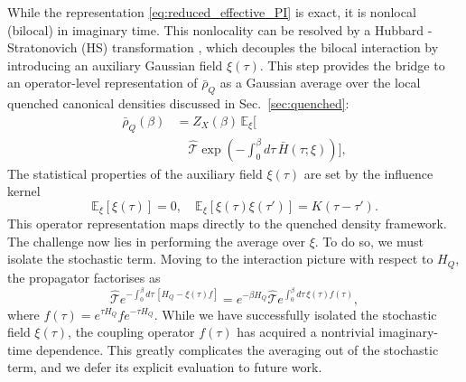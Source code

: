 While the representation \eqref{eq:reduced_effective_PI} is exact, it is nonlocal (bilocal) in imaginary time. This nonlocality can be resolved by a Hubbard - Stratonovich (HS) transformation \cite{hubbardCalculationPartitionFunctions1959a, stratonovich1957QDistro}, which decouples the bilocal interaction by introducing an auxiliary Gaussian field $\xi(\tau)$. This step provides the bridge to an operator-level representation of $\bar{\rho}_Q$ as a Gaussian average over the local quenched canonical densities discussed in Sec.~\ref{sec:quenched}:
\begin{equation}
\begin{split}
    \bar\rho_Q(\beta) 
    &= 
    Z_X(\beta)\,\mathbb E_\xi\bigg[ \\
    &\quad \hat{\mathcal{T}}\exp\!\left(-\int_0^\beta d\tau\,\bar{H}(\tau;\xi)\right) \bigg],
\end{split}
    \label{eq:bar_rho_as_quenched_average}
\end{equation}
The statistical properties of the auxiliary field $\xi(\tau)$ are set by the influence kernel \cite{mccaulPartitionfreeApproachOpen2017c,mccaulDrivingSpinbosonModels2018a,mccaulHowWinFriends2021b}
\begin{equation}
    \mathbb{E}_\xi[\xi(\tau)] = 0, \quad \mathbb{E}_\xi[\xi(\tau)\xi(\tau')] = K(\tau-\tau').
    \label{eq:noise_statistics}
\end{equation}
This operator representation maps directly to the quenched density framework. The challenge now lies in performing the average over $\xi$. To do so, we must isolate the stochastic term. Moving to the interaction picture with respect to $H_Q$, the propagator factorises as
\begin{equation}
    \hat{\mathcal{T}}e^{-\int_0^\beta d\tau\,[H_Q - \xi(\tau)f]} = e^{-\beta H_Q} \hat{\mathcal{T}}e^{\int_0^\beta d\tau\, \xi(\tau) f(\tau)},
    \label{eq:interaction_picture_split}
\end{equation}
where $f(\tau) = e^{\tau H_Q} f e^{-\tau H_Q}$. While we have successfully isolated the stochastic field $\xi(\tau)$, the coupling operator $f(\tau)$ has acquired a nontrivial imaginary-time dependence. This greatly complicates the averaging out of the stochastic term, and we defer its explicit evaluation to future work. 

